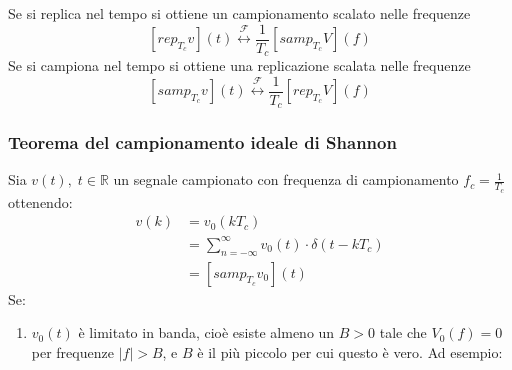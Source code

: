 \documentclass[a4paper]{article}
\begin{document}
\vspace{1em}
\noindent
Se si replica nel tempo si ottiene un campionamento scalato nelle frequenze
\[
  \left[ rep_{T_c} v\right](t) \stackrel{\mathcal{F}}{\leftrightarrow} \frac{1}{T_c} \left[ samp_{T_c} V \right](f)
\] 
Se si campiona nel tempo si ottiene una replicazione scalata nelle frequenze
\[
  \left[ samp_{T_c} v \right](t) \stackrel{\mathcal{F}}{\leftrightarrow} \frac{1}{T_c} \left[ rep_{T_c} V \right](f)
\] 

\subsubsection{Teorema del campionamento ideale di Shannon}
\begin{theorem}
  Sia \( v(t), \; t \in \mathbb{R} \) un segnale campionato con frequenza di campionamento
  \( f_c = \frac{1}{T_c} \) ottenendo:
  \[
    \begin{aligned}
      v(k) &= v_0(kT_c)\\
           &= \sum_{n = -\infty}^{\infty} v_0(t) \cdot \delta(t - kT_c)\\
           &= \left[ samp_{T_c} v_0 \right](t)
    \end{aligned}
  \] 
  Se:
  \begin{enumerate}
    \item \( v_0(t) \) è limitato in banda, cioè esiste almeno un \( B > 0 \) tale che
      \( V_0(f) = 0 \) per frequenze \( |f| > B \), e \( B \) è il più piccolo per cui
      questo è vero. Ad esempio:
      \begin{figure}[H]
        \centering
\end{figure}
\end{enumerate}
\end{theorem}
\end{document}
